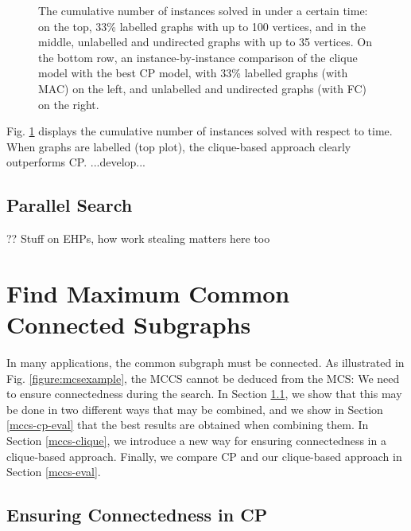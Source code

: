 \documentclass{llncs}
\begin{document}
\begin{figure}[p]
    \centering
    
    \vspace*{1em}

    \centering
    
    \caption{The cumulative number of instances solved in under a certain time: on the top, 33\%
        labelled graphs with up to 100 vertices, and in the middle, unlabelled and undirected graphs
        with up to 35 vertices. On the bottom row, an instance-by-instance comparison of the clique
        model with the best CP model, with 33\% labelled graphs (with MAC) on the left, and
        unlabelled and undirected graphs (with FC) on the right.} \label{figure:unconnected-cumulative}
\end{figure}

Fig. \ref{figure:unconnected-cumulative} displays the cumulative number of instances solved with respect to time. 
When graphs are labelled (top plot), the clique-based approach clearly outperforms CP. ...develop...

\subsection{Parallel Search}

\cite{DBLP:journals/jcc/KoncDTRJ12,DBLP:journals/algorithms/McCreeshP13,DBLP:journals/topc/McCreeshP15,DBLP:journals/cor/SegundoLP16}

?? Stuff on EHPs, how work stealing matters here too \cite{DBLP:journals/jco/BatsynGMP14}

\section{Find Maximum Common Connected Subgraphs}\label{mccs}

In many applications, the common subgraph must be connected. As illustrated in Fig. \ref{figure:mcsexample}, the MCCS cannot be deduced from the MCS: We need to ensure connectedness during the search. In Section \ref{mccs-cp}, we show that this may be done in two different ways that may be combined, and we show in Section \ref{mccs-cp-eval} that the best results are obtained when combining them. In Section \ref{mccs-clique}, we introduce a new way for ensuring connectedness in a clique-based approach. Finally, we compare CP and our clique-based approach in Section \ref{mccs-eval}.

\subsection{Ensuring Connectedness in CP}\label{mccs-cp}
\end{document}
